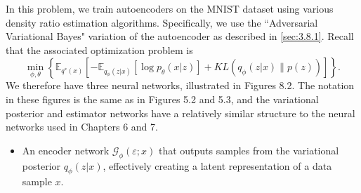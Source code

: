 \documentclass[honours,12pt, twoside]{unswthesis}
\newcommand{\E}{\mathbb{E}}
\numberwithin{equation}{section}
\theoremstyle{definition}
\begin{document}
In this problem, we train autoencoders on the MNIST dataset using various density ratio estimation algorithms. Specifically, we use the ``Adversarial Variational Bayes" variation of the autoencoder as described in \autoref{sec:3.8.1}. Recall that the associated optimization problem is
\[\min_{\phi,\theta}\left\lbrace\E_{q^*(x)}\left[-\E_{q_\phi(z|x)}[\log p_\theta(x|z)]+KL(q_\phi(z|x)\|p(z))\right]\right\rbrace.\]
We therefore have three neural networks, illustrated in Figures 8.2. The notation in these figures is the same as in Figures 5.2 and 5.3, and the variational posterior and estimator networks have a relatively similar structure to the neural networks used in Chapters 6 and 7.
\begin{itemize}
\item An encoder network $\mathcal{G}_\phi(\varepsilon;x)$ that outputs samples from the variational posterior $q_\phi(z|x)$, effectively creating a latent representation of a data sample $x$.
\begin{figure}[h!]
\end{figure}
\end{itemize}
\end{document}
